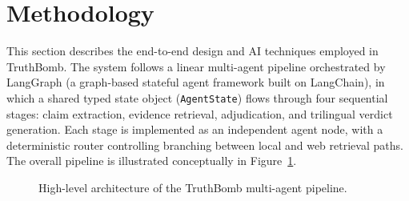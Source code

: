 \documentclass[12pt,a4paper]{article}
\begin{document}
\section{Methodology}
\label{sec:methodology}

This section describes the end-to-end design and AI techniques employed in
TruthBomb. The system follows a linear multi-agent pipeline orchestrated by
LangGraph (a graph-based stateful agent framework built on LangChain), in which a shared typed state object
(\texttt{AgentState}) flows through four sequential stages: claim extraction,
evidence retrieval, adjudication, and trilingual verdict generation. Each
stage is implemented as an independent agent node, with a deterministic
router controlling branching between local and web retrieval paths. The
overall pipeline is illustrated conceptually in Figure~\ref{fig:pipeline}.

\begin{figure}[H]
\centering
{}
\caption{High-level architecture of the TruthBomb multi-agent pipeline.}
\label{fig:pipeline}
\end{figure}
\end{document}
